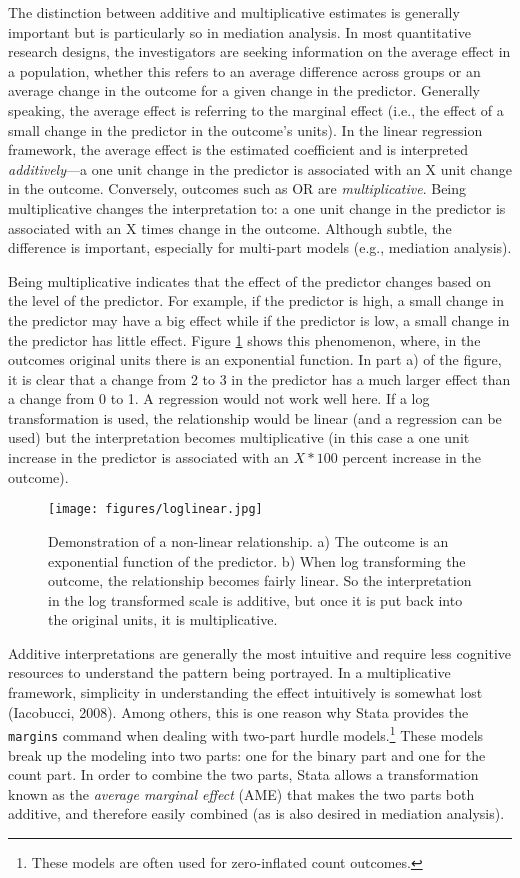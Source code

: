 \documentclass[]{DissertateUSU}
\let\rmarkdownfootnote\footnote%
\def\footnote{\protect\rmarkdownfootnote}
\begin{document}
The distinction between additive and multiplicative estimates is
generally important but is particularly so in mediation analysis. In
most quantitative research designs, the investigators are seeking
information on the average effect in a population, whether this refers
to an average difference across groups or an average change in the
outcome for a given change in the predictor. Generally speaking, the
average effect is referring to the marginal effect (i.e., the effect of
a small change in the predictor in the outcome's units). In the linear
regression framework, the average effect is the estimated coefficient
and is interpreted \emph{additively}---a one unit change in the
predictor is associated with an X unit change in the outcome.
Conversely, outcomes such as OR are \emph{multiplicative}. Being
multiplicative changes the interpretation to: a one unit change in the
predictor is associated with an X times change in the outcome. Although
subtle, the difference is important, especially for multi-part models
(e.g., mediation analysis).

Being multiplicative indicates that the effect of the predictor changes
based on the level of the predictor. For example, if the predictor is
high, a small change in the predictor may have a big effect while if the
predictor is low, a small change in the predictor has little effect.
Figure \ref{fig:loglinear} shows this phenomenon, where, in the outcomes
original units there is an exponential function. In part a) of the
figure, it is clear that a change from 2 to 3 in the predictor has a
much larger effect than a change from 0 to 1. A regression would not
work well here. If a log transformation is used, the relationship would
be linear (and a regression can be used) but the interpretation becomes
multiplicative (in this case a one unit increase in the predictor is
associated with an \(X*100\) percent increase in the outcome).

\begin{figure}[tb]
  \centering
  \texttt{[image: figures/loglinear.jpg]}
  \caption{Demonstration of a non-linear relationship. a) The outcome is an exponential function of the predictor. b) When log transforming the outcome, the relationship becomes fairly linear. So the interpretation in the log transformed scale is additive, but once it is put back into the original units, it is multiplicative.}
  \label{fig:loglinear}
\end{figure}

Additive interpretations are generally the most intuitive and require
less cognitive resources to understand the pattern being portrayed. In a
multiplicative framework, simplicity in understanding the effect
intuitively is somewhat lost (Iacobucci, 2008). Among others, this is
one reason why Stata provides the \texttt{margins} command when dealing
with two-part hurdle
models.\footnote{These models are often used for zero-inflated count outcomes.}
These models break up the modeling into two parts: one for the binary
part and one for the count part. In order to combine the two parts,
Stata allows a transformation known as the \emph{average marginal
effect} (AME) that makes the two parts both additive, and therefore
easily combined (as is also desired in mediation analysis).
\end{document}

